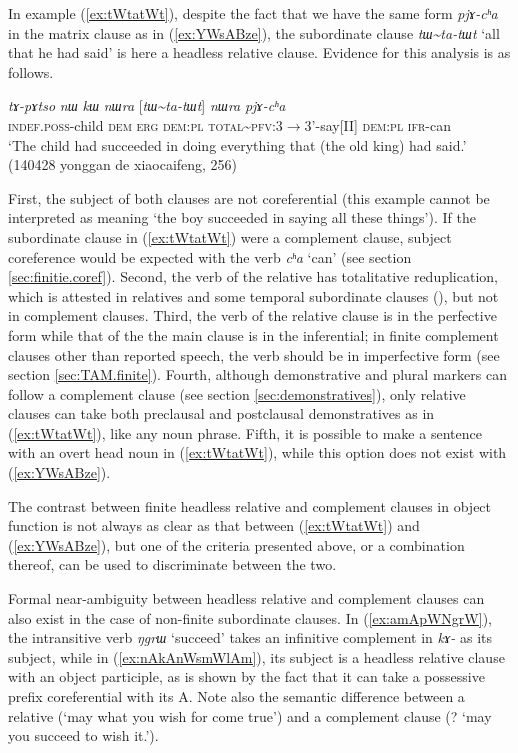 \documentclass[oneside,a4paper,11pt]{article}
\newcommand{\ipa}[1]{\textit{\phon#1}}
\newcommand{\jpg}[2]{\ipa{#1} `#2'}
\newcommand{\tld}{\textasciitilde{}}
\newcommand{\refb}[1]{(\ref{#1})}
\begin{document}
In example \refb{ex:tWtatWt}, despite the fact that we have the same form \ipa{pjɤ-cʰa} in the matrix clause as in \refb{ex:YWsABze}, the subordinate clause \ipa{tɯ\tld{}ta-tɯt} `all that he had said' is here a headless relative clause. Evidence for this analysis is as follows.

\begin{exe}
\ex \label{ex:tWtatWt}
\gll 
\ipa{tɤ-pɤtso} 	\ipa{nɯ} \ipa{kɯ}	\ipa{nɯra} 	[\ipa{tɯ\tld{}ta-tɯt}] 	\ipa{nɯra} 	\ipa{pjɤ-cʰa} \\
\textsc{indef.poss}-child \textsc{dem} \textsc{erg} \textsc{dem:pl} \textsc{total\tld{}pfv}:3$\rightarrow$3'-say[II] \textsc{dem:pl} \textsc{ifr}-can \\
\glt `The child had succeeded in doing everything that (the old king) had said.' (140428 yonggan de xiaocaifeng, 256)
\end{exe}

First, the subject of both clauses are not coreferential (this example cannot be interpreted as meaning `the boy succeeded in saying all these things'). If the subordinate clause in (\ref{ex:tWtatWt}) were a complement clause, subject coreference would be expected with the verb \jpg{cʰa}{can} (see section \ref{sec:finitie.coref}). Second, the verb of the relative has totalitative reduplication, which is attested in relatives and some temporal subordinate clauses (\citealt[295]{jacques14linking}), but not in complement clauses. Third, the verb of the relative clause is in the perfective form while that of the the main clause is in the inferential; in finite complement clauses other than reported speech, the verb should be in imperfective form (see section \ref{sec:TAM.finite}). Fourth, although demonstrative and plural markers can follow a complement clause (see section \ref{sec:demonstratives}), only relative clauses can take both preclausal and postclausal demonstratives as in \refb{ex:tWtatWt}, like any noun phrase. Fifth, it is possible to make a sentence with an overt head noun in \refb{ex:tWtatWt}, while this option does not exist with \refb{ex:YWsABze}.

The contrast between finite headless relative and complement clauses in object function is not always as clear as that between \refb{ex:tWtatWt} and \refb{ex:YWsABze}, but one of the criteria presented above, or a combination thereof, can be used to discriminate between the two.

Formal near-ambiguity between headless relative and complement clauses can also exist in the case of non-finite subordinate clauses. In (\ref{ex:amApWNgrW}), the intransitive verb \jpg{ŋgrɯ}{succeed} takes an infinitive complement in \ipa{kɤ-} as its subject, while in (\ref{ex:nAkAnWsmWlAm}), its subject is a headless relative clause with an object participle, as is shown by the fact that it can take a possessive prefix coreferential with its A. Note also the semantic difference between a relative (`may what you wish for come true') and a complement clause (? `may you succeed to wish it.').
\end{document}
